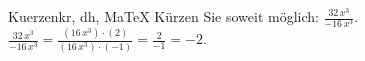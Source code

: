 \begin{MAufgabe}{Kuerzen}{kr, dh, MaTeX}
K\"urzen Sie soweit m\"oglich: $\frac{32\, x^3}{- 16\, x^3}$.\\ 
\ifLsg\MLoesung
\quad $\frac{32\, x^3}{- 16\, x^3}=\frac{(16\, x^3)\cdot(2)}{(16\, x^3)\cdot(-1)}=\frac{2}{-1}=-2$.\else\relax\fi
 \end{MAufgabe}